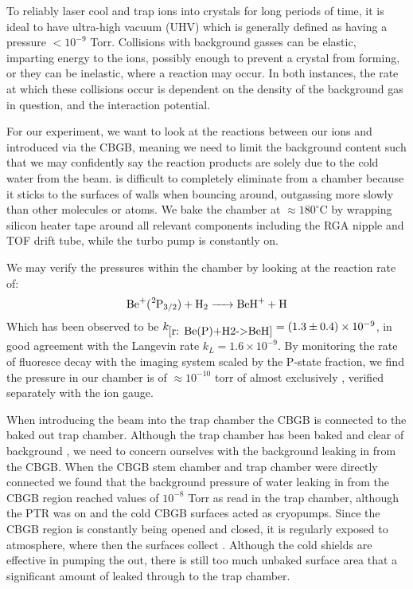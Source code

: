 To reliably laser cool and trap ions into crystals for long periods of time, it is ideal to have ultra-high vacuum (UHV) which is generally defined as having a pressure $<10^{-9}$ Torr. Collisions with background gasses can be elastic, imparting energy to the ions, possibly enough to prevent a crystal from forming, or they can be inelastic, where a reaction may occur. In both instances, the rate at which these collisions occur is dependent on the density of the background gas in question, and the interaction potential.

For our experiment, we want to look at the reactions between our ions and  introduced via the CBGB, meaning we need to limit the background  content such that we may confidently say the reaction products are solely due to the cold water from the beam.  is difficult to completely eliminate from a chamber because it sticks to the surfaces of walls when bouncing around, outgassing more slowly than other molecules or atoms. We bake the chamber at $\approx 180^\circ$C by wrapping silicon heater tape around all relevant components including the RGA nipple and TOF drift tube, while the turbo pump is constantly on.

We may verify the pressures within the chamber by looking at the reaction rate of:
\begin{equation}
	\ce{Be+(^2P3/2) + H2 -> BeH+ + H}
	\label{r: Be(P)+H2->BeH}
\end{equation}
Which has been observed to be $k_{\ref{r: Be(P)+H2->BeH}} = (1.3 \pm 0.4)\times 10^{-9}$, in good agreement with the Langevin rate $k_L=1.6 \times 10^{-9}$.\cite{Roth2006} By monitoring the rate of fluoresce decay with the imaging system scaled by the P-state fraction, we find the pressure in our chamber is of $\approx 10^{-10}$ torr of almost exclusively , verified separately with the ion gauge.

When introducing the beam into the trap chamber the CBGB is connected to the baked out trap chamber. Although the trap chamber has been baked and clear of background , we need to concern ourselves with the background  leaking in from the CBGB. When the CBGB stem chamber and trap chamber were directly connected we found that the background pressure of water leaking in from the CBGB region reached values of $10^{-8}$ Torr as read in the trap chamber, although the PTR was on and the cold CBGB surfaces acted as cryopumps. Since the CBGB region is constantly being opened and closed, it is regularly exposed to atmosphere, where then the surfaces collect . Although the cold shields are effective in pumping the  out, there is still too much unbaked surface area that a significant amount of  leaked through to the trap chamber.

